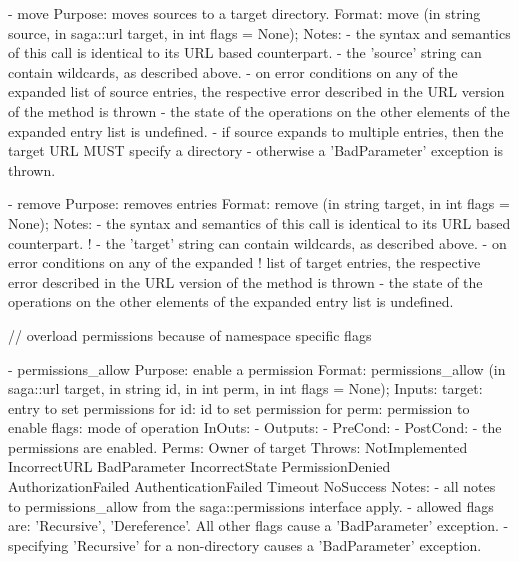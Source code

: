 \begin{myspec}
    - move
      Purpose:  moves sources to a target directory.
      Format:   move               (in  string     source,
                                    in  saga::url  target,
                                    in  int        flags = None);
      Notes:    - the syntax and semantics of this call is 
                  identical to its URL based counterpart.  
                - the 'source' string can contain wildcards, as
                  described above.
                - on error conditions on any of the expanded 
                  list of source entries, the respective error 
                  described in the URL version of the method is 
                  thrown - the state of the operations on the 
                  other elements of the expanded entry list is 
                  undefined.
                - if source expands to multiple entries, then the
                  target URL MUST specify a directory -
                  otherwise a 'BadParameter' exception is thrown.
 
    - remove
      Purpose:  removes entries
      Format:   remove             (in  string  target,
                                    in  int     flags = None);
      Notes:    - the syntax and semantics of this call is 
                  identical to its URL based counterpart.  
!               - the 'target' string can contain wildcards, as
                  described above.
                - on error conditions on any of the expanded 
!                 list of target entries, the respective error 
                  described in the URL version of the method is 
                  thrown - the state of the operations on the 
                  other elements of the expanded entry list is 
                  undefined.
 
 
    // overload permissions because of namespace specific flags
 
    - permissions_allow
      Purpose:  enable a permission 
      Format:   permissions_allow    (in  saga::url target, 
                                      in  string    id,
                                      in  int       perm, 
                                      in  int       flags = None);
      Inputs:   target:               entry to set permissions for
                id:                   id to set permission for
                perm:                 permission to enable
                flags:                mode of operation
      InOuts:   -
      Outputs:  -
      PreCond:  -
      PostCond: - the permissions are enabled.
      Perms:    Owner of target
      Throws:   NotImplemented
                IncorrectURL
                BadParameter
                IncorrectState
                PermissionDenied
                AuthorizationFailed
                AuthenticationFailed
                Timeout
                NoSuccess
      Notes:    - all notes to permissions_allow from the
                  saga::permissions interface apply.
                - allowed flags are: 'Recursive', 'Dereference'.
                  All other flags cause a 'BadParameter'
                  exception.
                - specifying 'Recursive' for a non-directory
                  causes a 'BadParameter' exception.
 

\end{myspec}
